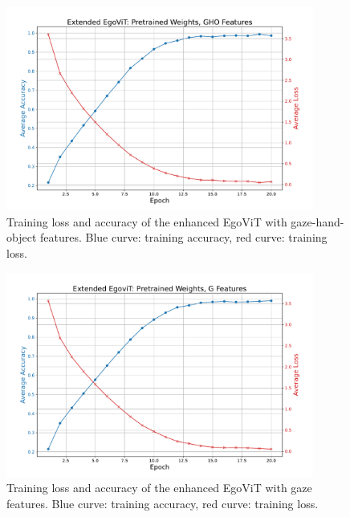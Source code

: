 \begin{figure}
    \centering
    \includegraphics[width=0.9\textwidth]{graphics/figure41}
    \caption{Training loss and accuracy of the enhanced EgoViT with gaze-hand-object features. Blue curve: training accuracy, red curve: training loss.}
    \label{fig:egovit-with-gho}
\end{figure}
\begin{figure}
    \centering
    \includegraphics[width=0.9\textwidth]{graphics/figure51}
    \caption{Training loss and accuracy of the enhanced EgoViT with gaze features. Blue curve: training accuracy, red curve: training loss.}
    \label{fig:egovit-with-gaze}
\end{figure}
\newpage
